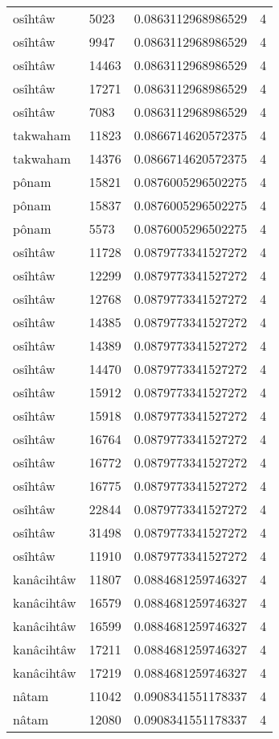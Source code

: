 \begin{longtable}{llll}
osîhtâw & 5023 & 0.0863112968986529 & 4 \\
osîhtâw & 9947 & 0.0863112968986529 & 4 \\
osîhtâw & 14463 & 0.0863112968986529 & 4 \\
osîhtâw & 17271 & 0.0863112968986529 & 4 \\
osîhtâw & 7083 & 0.0863112968986529 & 4 \\
takwaham & 11823 & 0.0866714620572375 & 4 \\
takwaham & 14376 & 0.0866714620572375 & 4 \\
pônam & 15821 & 0.0876005296502275 & 4 \\
pônam & 15837 & 0.0876005296502275 & 4 \\
pônam & 5573 & 0.0876005296502275 & 4 \\
osîhtâw & 11728 & 0.0879773341527272 & 4 \\
osîhtâw & 12299 & 0.0879773341527272 & 4 \\
osîhtâw & 12768 & 0.0879773341527272 & 4 \\
osîhtâw & 14385 & 0.0879773341527272 & 4 \\
osîhtâw & 14389 & 0.0879773341527272 & 4 \\
osîhtâw & 14470 & 0.0879773341527272 & 4 \\
osîhtâw & 15912 & 0.0879773341527272 & 4 \\
osîhtâw & 15918 & 0.0879773341527272 & 4 \\
osîhtâw & 16764 & 0.0879773341527272 & 4 \\
osîhtâw & 16772 & 0.0879773341527272 & 4 \\
osîhtâw & 16775 & 0.0879773341527272 & 4 \\
osîhtâw & 22844 & 0.0879773341527272 & 4 \\
osîhtâw & 31498 & 0.0879773341527272 & 4 \\
osîhtâw & 11910 & 0.0879773341527272 & 4 \\
kanâcihtâw & 11807 & 0.0884681259746327 & 4 \\
kanâcihtâw & 16579 & 0.0884681259746327 & 4 \\
kanâcihtâw & 16599 & 0.0884681259746327 & 4 \\
kanâcihtâw & 17211 & 0.0884681259746327 & 4 \\
kanâcihtâw & 17219 & 0.0884681259746327 & 4 \\
nâtam & 11042 & 0.0908341551178337 & 4 \\
nâtam & 12080 & 0.0908341551178337 & 4 \\

\end{longtable}

